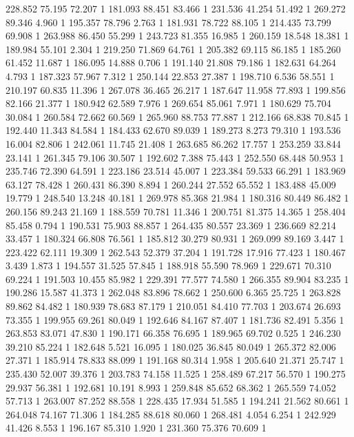 	228.852	75.195	72.207	1
	181.093	88.451	83.466	1
	231.536	41.254	51.492	1
	269.272	89.346	4.960	1
	195.357	78.796	2.763	1
	181.931	78.722	88.105	1
	214.435	73.799	69.908	1
	263.988	86.450	55.299	1
	243.723	81.355	16.985	1
	260.159	18.548	18.381	1
	189.984	55.101	2.304	1
	219.250	71.869	64.761	1
	205.382	69.115	86.185	1
	185.260	61.452	11.687	1
	186.095	14.888	0.706	1
	191.140	21.808	79.186	1
	182.631	64.264	4.793	1
	187.323	57.967	7.312	1
	250.144	22.853	27.387	1
	198.710	6.536	58.551	1
	210.197	60.835	11.396	1
	267.078	36.465	26.217	1
	187.647	11.958	77.893	1
	199.856	82.166	21.377	1
	180.942	62.589	7.976	1
	269.654	85.061	7.971	1
	180.629	75.704	30.084	1
	260.584	72.662	60.569	1
	265.960	88.753	77.887	1
	212.166	68.838	70.845	1
	192.440	11.343	84.584	1
	184.433	62.670	89.039	1
	189.273	8.273	79.310	1
	193.536	16.004	82.806	1
	242.061	11.745	21.408	1
	263.685	86.262	17.757	1
	253.259	33.844	23.141	1
	261.345	79.106	30.507	1
	192.602	7.388	75.443	1
	252.550	68.448	50.953	1
	235.746	72.390	64.591	1
	223.186	23.514	45.007	1
	223.384	59.533	66.291	1
	183.969	63.127	78.428	1
	260.431	86.390	8.894	1
	260.244	27.552	65.552	1
	183.488	45.009	19.779	1
	248.540	13.248	40.181	1
	269.978	85.368	21.984	1
	180.316	80.449	86.482	1
	260.156	89.243	21.169	1
	188.559	70.781	11.346	1
	200.751	81.375	14.365	1
	258.404	85.458	0.794	1
	190.531	75.903	88.857	1
	264.435	80.557	23.369	1
	236.669	82.214	33.457	1
	180.324	66.808	76.561	1
	185.812	30.279	80.931	1
	269.099	89.169	3.447	1
	223.422	62.111	19.309	1
	262.543	52.379	37.204	1
	191.728	17.916	77.423	1
	180.467	3.439	1.873	1
	194.557	31.525	57.845	1
	188.918	55.590	78.969	1
	229.671	70.310	69.224	1
	191.503	10.455	85.982	1
	229.391	77.577	74.580	1
	266.355	89.904	83.235	1
	190.286	15.587	41.373	1
	262.048	83.896	78.662	1
	250.600	6.365	25.725	1
	263.828	89.862	84.482	1
	180.939	78.683	87.179	1
	210.051	84.410	77.703	1
	203.674	26.693	73.355	1
	199.955	69.261	80.049	1
	192.646	84.167	87.407	1
	181.736	82.491	5.356	1
	263.853	83.071	47.830	1
	190.171	66.358	76.695	1
	189.965	69.702	0.525	1
	246.230	39.210	85.224	1
	182.648	5.521	16.095	1
	180.025	36.845	80.049	1
	265.372	82.006	27.371	1
	185.914	78.833	88.099	1
	191.168	80.314	1.958	1
	205.640	21.371	25.747	1
	235.430	52.007	39.376	1
	203.783	74.158	11.525	1
	258.489	67.217	56.570	1
	190.275	29.937	56.381	1
	192.681	10.191	8.993	1
	259.848	85.652	68.362	1
	265.559	74.052	57.713	1
	263.007	87.252	88.558	1
	228.435	17.934	51.585	1
	194.241	21.562	80.661	1
	264.048	74.167	71.306	1
	184.285	88.618	80.060	1
	268.481	4.054	6.254	1
	242.929	41.426	8.553	1
	196.167	85.310	1.920	1
	231.360	75.376	70.609	1
